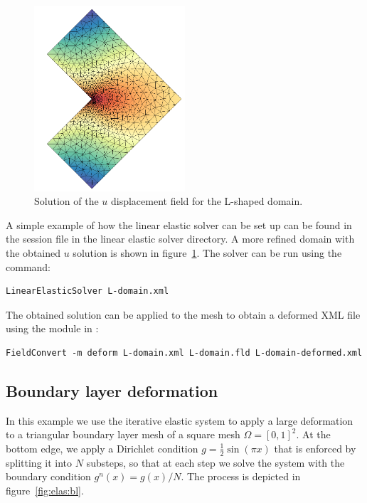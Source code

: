 \begin{figure}
  \begin{center}
    \includegraphics[width=0.5\textwidth]{Figures/l-shape}
  \end{center}
  \caption{Solution of the $u$ displacement field for the L-shaped domain.}
  \label{fig:elas:ldomain}
\end{figure}

A simple example of how the linear elastic solver can be set up can be found in
the  session file in the linear elastic solver
directory. A more refined domain with the obtained $u$ solution is shown in
figure~\ref{fig:elas:ldomain}. The solver can be run using the command:

\begin{lstlisting}[style=BashInputStyle]
  LinearElasticSolver L-domain.xml
\end{lstlisting}

The obtained solution  can be applied to the mesh to obtain
a deformed XML file using the  module in :

\begin{lstlisting}[style=BashInputStyle]
  FieldConvert -m deform L-domain.xml L-domain.fld L-domain-deformed.xml
\end{lstlisting}

\subsection{Boundary layer deformation}

In this example we use the iterative elastic system to apply a large deformation
to a triangular boundary layer mesh of a square mesh $\Omega = [0,1]^2$. At the
bottom edge, we apply a Dirichlet condition $g=\tfrac{1}{2}\sin(\pi x)$ that is
enforced by splitting it into $N$ substeps, so that at each step we solve the
system with the boundary condition $g^n(x) = g(x)/N$. The process is depicted in
figure~\ref{fig:elas:bl}.

